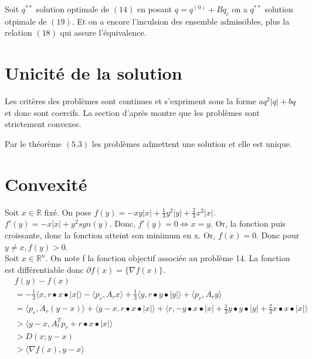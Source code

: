 \documentclass[12pt, letterpaper]{article}
\newcommand{\R}{\mathbb{R}^n}
\begin{document}
\noindent Soit $q^{**}$ solution optimale de $(14)$ en posant $q = q^{(0)} + B q_c$ on a $q^{**}$ solution otpimale de $(19)$. Et on a encore l'inculsion des ensemble admissibles, plus la relation $(18)$ qui assure l'équivalence.

\section{Unicité de la solution}

Les critères des problèmes sont continues et s'expriment sous la forme $a q^2|q| + b q$ et donc sont coercifs. La section d'après montre que les problèmes sont strictement convexes.

Par le théorème $(5.3)$ les problèmes admettent une solution et elle est unique.

\section{Convexité}
Soit $x\in \mathbb{R}$ fixé. On pose $f(y) = -x y |x| + \frac{1}{3} y^2 |y| + \frac{2}{3} x^2 |x|$.
 $f'(y) = -x |x| + y^2 sgn(y)$. Donc, $f'(y) = 0 \Leftrightarrow x = y$. Or, la fonction puis croissante, donc la fonction atteint son minimum en x. Or, $f(x) = 0$. Donc pour $y \neq x, f(y) > 0
$. \\

Soit $x\in\R$. On note f la fonction objectif associée au problème 14. La fonction est différentiable donc $\partial f(x) = \{\nabla f(x)\}$. 
\begin{align*}
&f(y) - f(x) \\
&= -\frac{1}{3} \langle x,r \bullet x \bullet |x|\rangle  - \langle p_r,A_rx\rangle  + \frac{1}{3}\langle y,r \bullet y \bullet |y|\rangle  + \langle p_r,A_ry\rangle   \\
&= \langle p_r,A_r(y - x)\rangle  + \langle y-x, r \bullet x \bullet |x|\rangle  + \langle r, -y \bullet x \bullet |x| + \frac{1}{3}y \bullet y \bullet |y| + \frac{2}{3}x \bullet x \bullet |x|\rangle \\
&>  \langle y-x,A_t^Tp_r + r \bullet x \bullet |x|\rangle  \tag{les termes que l'on a enlevé étaient positifs par le lemme ci-dessus} \\
&>  D(x;y-x)\\
&>  \langle \nabla f(x),y-x\rangle 
\end{align*}
\end{document}
